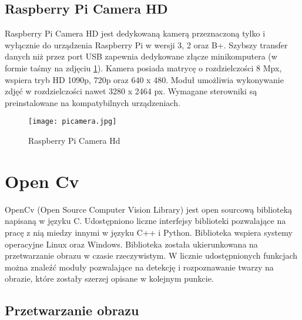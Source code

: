 \subsection{Raspberry Pi Camera HD}
Raspberry Pi Camera HD jest dedykowaną kamerą przeznaczoną tylko i wyłącznie do urządzenia Raspberry Pi w wersji 3, 2 oraz B+. Szybszy transfer danych niż przez port USB zapewnia dedykowane złącze minikomputera (w formie taśmy na zdjęciu \ref{fig:picamera}). Kamera posiada matrycę o rozdzielczości 8 Mpx, wspiera tryb HD 1090p, 720p oraz 640 x 480. Moduł umożliwia wykonywanie zdjęć w rozdzielczości nawet 3280 x 2464 px. Wymagane sterowniki są preinstalowane na kompatybilnych urządzeniach.
\begin{figure}[H]
	\centering
	\texttt{[image: picamera.jpg]}
	\caption{Raspberry Pi Camera Hd}
	\label{fig:picamera}
\end{figure}

\section{Open Cv}
OpenCv (Open Source Computer Vision Library) jest open sourcową biblioteką napisaną w języku C. Udostępniono liczne interfejsy biblioteki pozwalające na pracę z nią miedzy innymi w języku C++ i Python. Biblioteka wspiera systemy operacyjne Linux oraz Windows. Biblioteka została ukierunkowana na przetwarzanie obrazu w czasie rzeczywistym. W licznie udostępnionych funkcjach można znaleźć moduły pozwalające na detekcję i rozpoznawanie twarzy na obrazie, które zostały szerzej opisane w kolejnym punkcie.

\subsection{Przetwarzanie obrazu}

